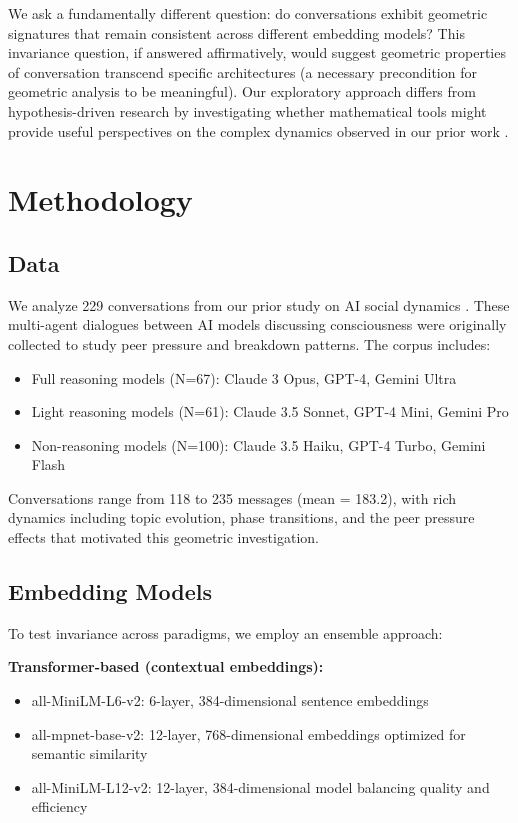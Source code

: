\documentclass[11pt,letterpaper]{article}
\newcommand{\totalConversations}{229}
\newcommand{\minConvLength}{118}
\newcommand{\maxConvLength}{235}
\newcommand{\meanConvLength}{183.2}
\begin{document}
We ask a fundamentally different question: do conversations exhibit geometric signatures that remain consistent across different embedding models? This invariance question, if answered affirmatively, would suggest geometric properties of conversation transcend specific architectures (a necessary precondition for geometric analysis to be meaningful). Our exploratory approach differs from hypothesis-driven research by investigating whether mathematical tools might provide useful perspectives on the complex dynamics observed in our prior work \citep{garcia2025peer}.

\section{Methodology}

\subsection{Data}

We analyze \totalConversations{} conversations from our prior study on AI social dynamics \citep{garcia2025peer}. These multi-agent dialogues between AI models discussing consciousness were originally collected to study peer pressure and breakdown patterns. The corpus includes:

\begin{itemize}
\item Full reasoning models (N=67): Claude 3 Opus, GPT-4, Gemini Ultra
\item Light reasoning models (N=61): Claude 3.5 Sonnet, GPT-4 Mini, Gemini Pro
\item Non-reasoning models (N=100): Claude 3.5 Haiku, GPT-4 Turbo, Gemini Flash
\end{itemize}

Conversations range from \minConvLength{} to \maxConvLength{} messages (mean = \meanConvLength{}), with rich dynamics including topic evolution, phase transitions, and the peer pressure effects that motivated this geometric investigation.

\subsection{Embedding Models}

To test invariance across paradigms, we employ an ensemble approach:

\textbf{Transformer-based (contextual embeddings):}
\begin{itemize}
\item all-MiniLM-L6-v2: 6-layer, 384-dimensional sentence embeddings
\item all-mpnet-base-v2: 12-layer, 768-dimensional embeddings optimized for semantic similarity
\item all-MiniLM-L12-v2: 12-layer, 384-dimensional model balancing quality and efficiency
\end{itemize}
\end{document}
